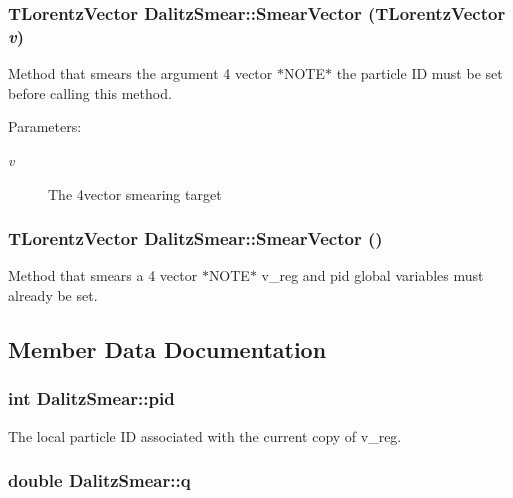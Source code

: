 \subsubsection{\setlength{\rightskip}{0pt plus 5cm}TLorentz\-Vector Dalitz\-Smear::Smear\-Vector (TLorentz\-Vector {\em v})}\label{classDalitzSmear_ae475bf2bea39d1ff580ad0e3ddaa71a}


Method that smears the argument 4 vector $\ast$NOTE$\ast$ the particle ID must be set before calling this method. 

\begin{Desc}
\item[Parameters:]
\begin{description}
\item[{\em v}]The 4vector smearing target \end{description}
\end{Desc}
\subsubsection{\setlength{\rightskip}{0pt plus 5cm}TLorentz\-Vector Dalitz\-Smear::Smear\-Vector ()}\label{classDalitzSmear_2461cb6cfeb9885b9fe9ac1c7992a814}


Method that smears a 4 vector $\ast$NOTE$\ast$ v\_\-reg and pid global variables must already be set. 



\subsection{Member Data Documentation}
\subsubsection{\setlength{\rightskip}{0pt plus 5cm}int \bf{Dalitz\-Smear::pid}}\label{classDalitzSmear_c7fd2ffdba0c574177bd5d6de605d7e5}


The local particle ID associated with the current copy of v\_\-reg. 

\subsubsection{\setlength{\rightskip}{0pt plus 5cm}double \bf{Dalitz\-Smear::q}}\label{classDalitzSmear_963895d9a71287579aaa90087c607081}


